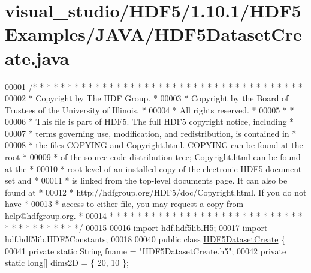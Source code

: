 \hypertarget{visual__studio_2_h_d_f5_21_810_81_2_h_d_f5_examples_2_j_a_v_a_2_h_d_f5_dataset_create_8java_source}{}\section{visual\+\_\+studio/\+H\+D\+F5/1.10.1/\+H\+D\+F5\+Examples/\+J\+A\+V\+A/\+H\+D\+F5\+Dataset\+Create.java}
\label{visual__studio_2_h_d_f5_21_810_81_2_h_d_f5_examples_2_j_a_v_a_2_h_d_f5_dataset_create_8java_source}

\begin{DoxyCode}
00001 \textcolor{comment}{/* * * * * * * * * * * * * * * * * * * * * * * * * * * * * * * * * * * * * * *}
00002 \textcolor{comment}{ * Copyright by The HDF Group.                                               *}
00003 \textcolor{comment}{ * Copyright by the Board of Trustees of the University of Illinois.         *}
00004 \textcolor{comment}{ * All rights reserved.                                                      *}
00005 \textcolor{comment}{ *                                                                           *}
00006 \textcolor{comment}{ * This file is part of HDF5.  The full HDF5 copyright notice, including     *}
00007 \textcolor{comment}{ * terms governing use, modification, and redistribution, is contained in    *}
00008 \textcolor{comment}{ * the files COPYING and Copyright.html.  COPYING can be found at the root   *}
00009 \textcolor{comment}{ * of the source code distribution tree; Copyright.html can be found at the  *}
00010 \textcolor{comment}{ * root level of an installed copy of the electronic HDF5 document set and   *}
00011 \textcolor{comment}{ * is linked from the top-level documents page.  It can also be found at     *}
00012 \textcolor{comment}{ * http://hdfgroup.org/HDF5/doc/Copyright.html.  If you do not have          *}
00013 \textcolor{comment}{ * access to either file, you may request a copy from help@hdfgroup.org.     *}
00014 \textcolor{comment}{ * * * * * * * * * * * * * * * * * * * * * * * * * * * * * * * * * * * * * * */}
00015 
00016 \textcolor{keyword}{import} hdf.hdf5lib.H5;
00017 \textcolor{keyword}{import} hdf.hdf5lib.HDF5Constants;
00018 
00040 \textcolor{keyword}{public} \textcolor{keyword}{class }\hyperlink{class_h_d_f5_dataset_create}{HDF5DatasetCreate} \{
00041     \textcolor{keyword}{private} \textcolor{keyword}{static} String fname  = \textcolor{stringliteral}{"HDF5DatasetCreate.h5"};
00042     \textcolor{keyword}{private} \textcolor{keyword}{static} \textcolor{keywordtype}{long}[] dims2D = \{ 20, 10 \};

\end{DoxyCode}
